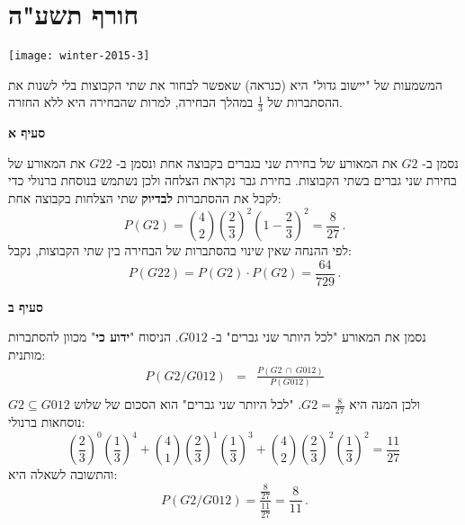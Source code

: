 
\newpage

\section{חורף תשע"ה}

\begin{center}
\texttt{[image: winter-2015-3]}
\end{center}

המשמעות של "יישוב גדול" היא (כנראה) שאפשר לבחור את שתי הקבוצות בלי לשנות את ההסתברות של 
$\frac{1}{3}$
במהלך הבחירה, למרות שהבחירה היא ללא החזרה.

\textbf{סעיף א}

נסמן ב-%
$G2$
את המאורע של בחירת שני בגברים בקבוצה אחת ונסמן ב-%
$G22$
את המאורע של בחירת שני גברים בשתי הקבוצות. בחירת גבר נקראת הצלחה ולכן נשתמש בנוסחת ברנולי כדי לקבל את ההסתברות
\textbf{לבדיוק}
שתי הצלחות בקבוצה אחת:
\[
P(G2)={4 \choose 2}\left(\frac{2}{3}\right)^2\left(1-\frac{2}{3}\right)^2=\frac{8}{27}\,.
\]
לפי ההנחה שאין שינוי בהסתברות של הבחירה בין שתי הקבוצות, נקבל:
\[
P(G22)=P(G2)\cdot P(G2)=\frac{64}{729}\,.
\]

\textbf{סעיף ב}

נסמן את המאורע "לכל היותר שני גברים" ב-%
$G012$.
הניסוח
"\textbf{ידוע כי}"
מכוון להסתברות מותנית:
\begin{eqnarray*}
P(G2/G012)&=&\frac{P(G2 \:\cap\: G012)}{P(G012)}\\
\end{eqnarray*}
$G2\subseteq G012$
ולכן המנה היא
$G2=\frac{8}{27}$.
"לכל היותר שני גברים" הוא הסכום של שלוש נוסחאות ברנולי:
\[
\left(\frac{2}{3}\right)^0\left(\frac{1}{3}\right)^4 + {4\choose 1}\left(\frac{2}{3}\right)^1\left(\frac{1}{3}\right)^3 + {4\choose 2}\left(\frac{2}{3}\right)^2\left(\frac{1}{3}\right)^2=\frac{11}{27}\,
\]
והתשובה לשאלה היא:
\[
P(G2/G012)=\frac{\frac{8}{27}}{\frac{11}{27}}=\frac{8}{11}\,.
\]

